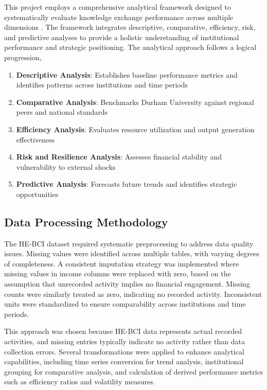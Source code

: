 \documentclass[journal,onecolumn, 10pt,draftclsnofoot]{IEEEtran}
\begin{document}
This project employs a comprehensive analytical framework designed to systematically evaluate knowledge exchange performance across multiple dimensions \cite{pacec2016state}. The framework integrates descriptive, comparative, efficiency, risk, and predictive analyses to provide a holistic understanding of institutional performance and strategic positioning. The analytical approach follows a logical progression,
\begin{enumerate}
    \item \textbf{Descriptive Analysis}: Establishes baseline performance metrics and identifies patterns across institutions and time periods
    \item \textbf{Comparative Analysis}: Benchmarks Durham University against regional peers and national standards
    \item \textbf{Efficiency Analysis}: Evaluates resource utilization and output generation effectiveness
    \item \textbf{Risk and Resilience Analysis}: Assesses financial stability and vulnerability to external shocks
    \item \textbf{Predictive Analysis}: Forecasts future trends and identifies strategic opportunities
\end{enumerate}

\subsection{Data Processing Methodology}

The HE-BCI dataset required systematic preprocessing to address data quality issues. Missing values were identified across multiple tables, with varying degrees of completeness. A consistent imputation strategy was implemented where missing values in income columns were replaced with zero, based on the assumption that unrecorded activity implies no financial engagement. Missing counts were similarly treated as zero, indicating no recorded activity. Inconsistent units were standardized to ensure comparability across institutions and time periods.

This approach was chosen because HE-BCI data represents actual recorded activities, and missing entries typically indicate no activity rather than data collection errors. Several transformations were applied to enhance analytical capabilities, including time series conversion for trend analysis, institutional grouping for comparative analysis, and calculation of derived performance metrics such as efficiency ratios and volatility measures.
\end{document}
